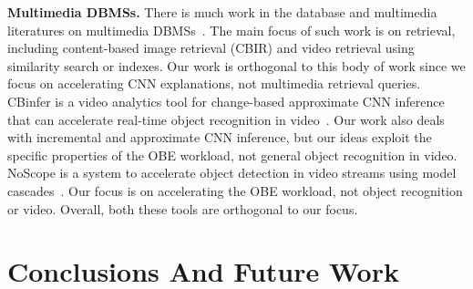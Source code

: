 \documentclass[10pt, sigconf]{acmart}
\begin{document}
\vspace{2mm}
\noindent \textbf{Multimedia DBMSs.} 
There is much work in the database and multimedia literatures on multimedia DBMSs~\cite{adjeroh1997multimedia,kalipsiz2000multimedia}. The main focus of such work is on retrieval, including content-based image retrieval (CBIR) and video retrieval using similarity search or indexes. Our work is orthogonal to this body of work since we focus on accelerating CNN explanations, not multimedia retrieval queries. CBinfer is a video analytics tool for change-based approximate CNN inference that can accelerate real-time object recognition in video~\cite{cavigelli2017cbinfer}. Our work also deals with incremental and approximate CNN inference, but our ideas exploit the specific properties of the OBE workload, not general object recognition in video. NoScope is a system to accelerate object detection in video streams using model cascades~\cite{kang2017noscope}. Our focus is on accelerating the OBE workload, not object recognition or video. Overall, both these tools are orthogonal to our focus.

\section{Conclusions And Future Work}






\end{document}
